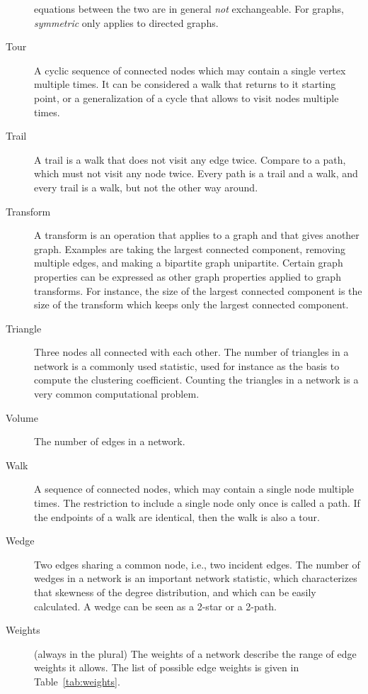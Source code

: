 \documentclass{article}
\begin{document}
\begin{description}
    equations between the two are in general \emph{not} exchangeable.
    For graphs, \emph{symmetric} only applies to directed graphs. 
  \item[Tour]
    A cyclic sequence of connected nodes which may contain a single
    vertex multiple times.  It can be considered a walk that returns to
    it starting point, or a generalization of a cycle that allows to
    visit nodes multiple times.  
  \item[Trail] A trail is a walk that does not visit any edge twice.
    Compare to a path, which must not visit any node twice.  Every path
    is a trail and a walk, and every trail is a walk, but not the other
    way around. 
  \item[Transform] 
    A transform is an operation that applies to a graph and that gives
    another graph.  Examples are taking the largest connected component,
    removing multiple edges, and making a bipartite graph unipartite.
    Certain graph properties can be expressed as other graph properties
    applied to graph transforms.  For instance, the size of the largest
    connected component is the size of the transform which keeps only
    the largest connected component. 
  \item[Triangle]
    Three nodes all connected with each other.  The number of triangles
    in a network is a commonly used statistic, used for instance as
    the basis to compute the clustering coefficient.  Counting the
    triangles in a network is a very common computational problem.  
  \item[Volume]
    The number of edges in a network.  
  \item[Walk]
    A sequence of connected nodes, which may contain a single node
    multiple times.  The restriction to include a single node only once
    is called a path.  If the endpoints of a walk are identical, then
    the walk is also a tour.  
  \item[Wedge] 
    Two edges sharing a common node, i.e., two incident edges.  The
    number of wedges in a network is an important network statistic,
    which characterizes that skewness of the degree distribution, and
    which can be easily calculated.  A wedge can be seen as a 2-star or
    a 2-path.  
  \item[Weights] (always in the plural)
    The weights of a network describe the range of edge weights it
    allows.  The list of possible edge weights is given in
    Table~\ref{tab:weights}.  
\end{description}
\end{document}
